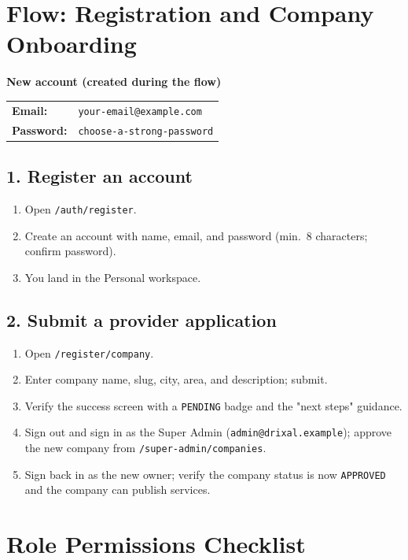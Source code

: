 \documentclass[11pt,a4paper]{article}
\makeatletter
\newcommand{\account}[3]{%
  \begin{tcolorbox}[colback=drixalsurface, colframe=drixalblue, boxrule=0.8pt, left=10pt, right=10pt, top=8pt, bottom=8pt, breakable]
    \textbf{\color{drixalblue}#1}\\
    \begin{tabular}{@{}ll}
      \textbf{Email:} & \texttt{#2} \\
      \textbf{Password:} & \texttt{#3} \\
    \end{tabular}
  \end{tcolorbox}
}
\makeatother
\begin{document}
\section{Flow: Registration and Company Onboarding}
\label{sec:flow-registration}

\account{New account (created during the flow)}{your-email@example.com}{choose-a-strong-password}

\subsection{1. Register an account}
\begin{enumerate}[leftmargin=2em, itemsep=2pt]
  \item Open \texttt{/auth/register}.
  \item Create an account with name, email, and password (min.\ 8 characters; confirm password).
  \item You land in the Personal workspace.
\end{enumerate}

\subsection{2. Submit a provider application}
\begin{enumerate}[leftmargin=2em, itemsep=2pt]
  \item Open \texttt{/register/company}.
  \item Enter company name, slug, city, area, and description; submit.
  \item Verify the success screen with a \texttt{PENDING} badge and the "next steps" guidance.
  \item Sign out and sign in as the Super Admin (\texttt{admin@drixal.example}); approve the new company from \texttt{/super-admin/companies}.
  \item Sign back in as the new owner; verify the company status is now \texttt{APPROVED} and the company can publish services.
\end{enumerate}

\section{Role Permissions Checklist}
\label{sec:permissions}
\end{document}
